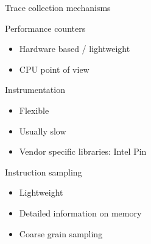 \documentclass[xcolor={usenames,dvipsnames},hyperref={pdfusetitle}]{beamer}
\begin{document}
\begin{frame}{Trace collection mechanisms}
    \begin{block}{Performance counters~\cite{Browne00Portable,Treibig10LIKWID}}
        \begin{itemize}
            \item Hardware based / lightweight
            \item CPU point of view
        \end{itemize}
    \end{block}
    \pause
    \begin{block}{Instrumentation}
        \begin{itemize}
            \item Flexible
            \item Usually slow
            \item Vendor specific libraries: Intel Pin~\cite{Luk05Pin}
        \end{itemize}
    \end{block}
    \pause
    \begin{exampleblock}{Instruction sampling~\cite{Drongowski07Instructionbased,Levinthal09Performance}}
        \begin{itemize}
            \item Lightweight
            \item Detailed information on memory
            \item Coarse grain sampling
        \end{itemize}
    \end{exampleblock}
\end{frame}
\end{document}

